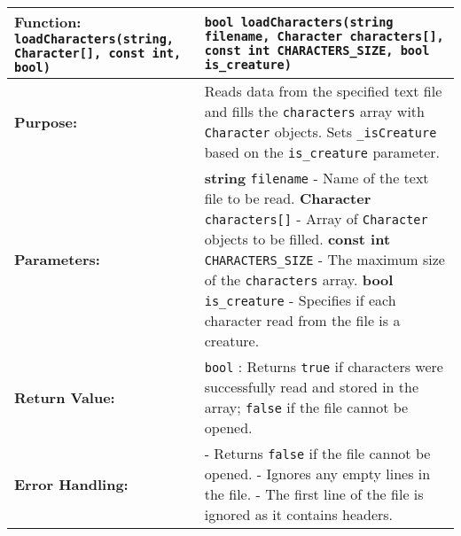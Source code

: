 \renewcommand{\arraystretch}{1.5}
\begin{longtable}{|p{1.7in}|p{4.3in}|}
\hline
\textbf{Function:} \texttt{loadCharacters(string,} \newline \texttt{Character[], const int,} \newline \texttt{bool)} & \texttt{bool loadCharacters(string filename, Character characters[],} \newline \texttt{const int CHARACTERS_SIZE, bool is_creature)} \\ \hline

\textbf{Purpose:} & Reads data from the specified text file and fills the \texttt{characters} array with \texttt{Character} objects. Sets \texttt{_isCreature} based on the \texttt{is\_creature} parameter. \\ \hline

\textbf{Parameters:} & 
\textbf{string} \texttt{filename} - Name of the text file to be read. \newline
\textbf{Character} \texttt{characters[]} - Array of \texttt{Character} objects to be filled. \newline
\textbf{const int} \texttt{CHARACTERS\_SIZE} - The maximum size of the \texttt{characters} array. \newline
\textbf{bool} \texttt{is\_creature} - Specifies if each character read from the file is a creature. \\ \hline

\textbf{Return Value:} & \texttt{bool} : Returns \texttt{true} if characters were successfully read and stored in the array; \texttt{false} if the file cannot be opened. \\ \hline

\textbf{Error Handling:} & 
- Returns \texttt{false} if the file cannot be opened. \newline
- Ignores any empty lines in the file. \newline
- The first line of the file is ignored as it contains headers. \\ \hline
\end{longtable}

